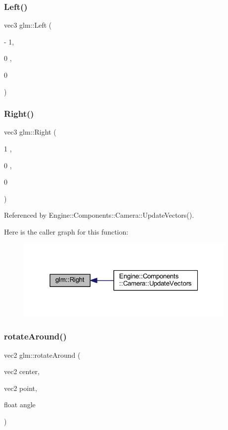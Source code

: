 \subsubsection{\texorpdfstring{Left()}{Left()}}
{\footnotesize\ttfamily vec3 glm\+::\+Left (\begin{DoxyParamCaption}\item[{-\/}]{1,  }\item[{0}]{,  }\item[{0}]{ }\end{DoxyParamCaption})}

\mbox{\label{namespaceglm_a8726baea7dc7bb32e57d33b0333d1def}} 
\subsubsection{\texorpdfstring{Right()}{Right()}}
{\footnotesize\ttfamily vec3 glm\+::\+Right (\begin{DoxyParamCaption}\item[{1}]{,  }\item[{0}]{,  }\item[{0}]{ }\end{DoxyParamCaption})}



Referenced by Engine\+::\+Components\+::\+Camera\+::\+Update\+Vectors().

Here is the caller graph for this function\+:
\nopagebreak
\begin{figure}[H]
\begin{center}
\leavevmode
\includegraphics[width=304pt]{namespaceglm_a8726baea7dc7bb32e57d33b0333d1def_icgraph}
\end{center}
\end{figure}
\mbox{\label{namespaceglm_a885c1f58e3aeeb85a2bfacd2c741e8d3}} 
\subsubsection{\texorpdfstring{rotate\+Around()}{rotateAround()}}
{\footnotesize\ttfamily vec2 glm\+::rotate\+Around (\begin{DoxyParamCaption}\item[{vec2}]{center,  }\item[{vec2}]{point,  }\item[{float}]{angle }\end{DoxyParamCaption})\hspace{0.3cm}{\ttfamily [inline]}}



